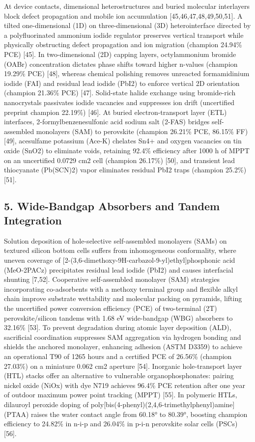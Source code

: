 \documentclass[
  11pt,
]{article}
\begin{document}
At device contacts, dimensional heterostructures and buried molecular
interlayers block defect propagation and mobile ion accumulation
{[}45,46,47,48,49,50,51{]}. A tilted one-dimensional (1D) on
three-dimensional (3D) heterointerface directed by a polyfluorinated
ammonium iodide regulator preserves vertical transport while physically
obstructing defect propagation and ion migration (champion 24.94\% PCE)
{[}45{]}. In two-dimensional (2D) capping layers, octylammonium bromide
(OABr) concentration dictates phase shifts toward higher n-values
(champion 19.29\% PCE) {[}48{]}, whereas chemical polishing removes
unreacted formamidinium iodide (FAI) and residual lead iodide (PbI2) to
enforce vertical 2D orientation (champion 21.36\% PCE) {[}47{]}.
Solid-state halide exchange using bromide-rich nanocrystals passivates
iodide vacancies and suppresses ion drift (uncertified preprint champion
22.19\%) {[}46{]}. At buried electron-transport layer (ETL) interfaces,
2-formylbenzenesulfonic acid sodium salt (2-FAS) bridges self-assembled
monolayers (SAM) to perovskite (champion 26.21\% PCE, 86.15\% FF)
{[}49{]}, acesulfame potassium (Ace-K) chelates Sn4+ and oxygen
vacancies on tin oxide (SnO2) to eliminate voids, retaining 92.4\%
efficiency after 1000 h of MPPT on an uncertified 0.0729 cm2 cell
(champion 26.17\%) {[}50{]}, and transient lead thiocyanate (Pb(SCN)2)
vapor eliminates residual PbI2 traps (champion 25.2\%) {[}51{]}.

\subsection{5. Wide-Bandgap Absorbers and Tandem
Integration}\label{wide-bandgap-absorbers-and-tandem-integration}

Solution deposition of hole-selective self-assembled monolayers (SAMs)
on textured silicon bottom cells suffers from inhomogeneous
conformality, where uneven coverage of
{[}2-(3,6-dimethoxy-9H-carbazol-9-yl)ethyl{]}phosphonic acid (MeO-2PACz)
precipitates residual lead iodide (PbI2) and causes interfacial shunting
{[}7,52{]}. Cooperative self-assembled monolayer (SAM) strategies
incorporating co-adsorbents with a methoxy terminal group and flexible
alkyl chain improve substrate wettability and molecular packing on
pyramids, lifting the uncertified power conversion efficiency (PCE) of
two-terminal (2T) perovskite/silicon tandems with 1.68 eV wide-bandgap
(WBG) absorbers to 32.16\% {[}53{]}. To prevent degradation during
atomic layer deposition (ALD), sacrificial coordination suppresses SAM
aggregation via hydrogen bonding and shields the anchored monolayer,
enhancing adhesion (ASTM D3359) to achieve an operational T90 of 1265
hours and a certified PCE of 26.56\% (champion 27.03\%) on a miniature
0.062 cm2 aperture {[}54{]}. Inorganic hole-transport layer (HTL) stacks
offer an alternative to vulnerable organophosphonates: pairing nickel
oxide (NiOx) with dye N719 achieves 96.4\% PCE retention after one year
of outdoor maximum power point tracking (MPPT) {[}55{]}. In polymeric
HTLs, dilauroyl peroxide doping of
poly{[}bis(4-phenyl)(2,4,6-trimethylphenyl)amine{]} (PTAA) raises the
water contact angle from 60.18° to 80.39°, boosting champion efficiency
to 24.82\% in n-i-p and 26.04\% in p-i-n perovskite solar cells (PSCs)
{[}56{]}.
\end{document}
